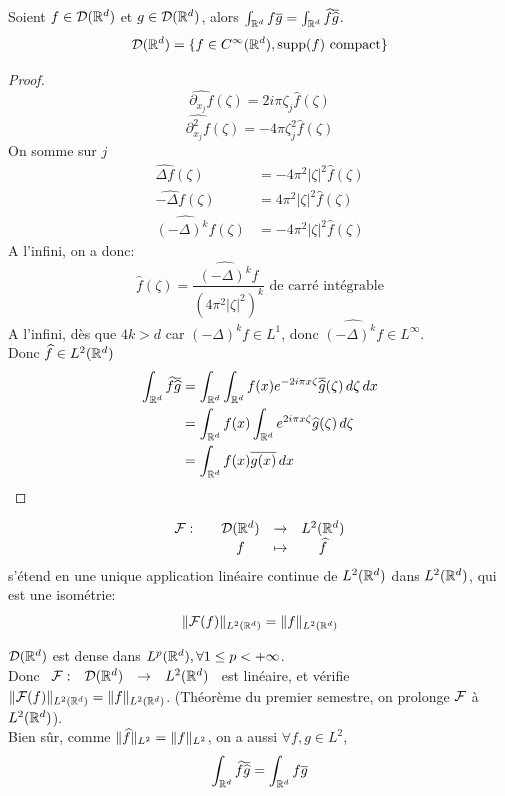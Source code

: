 \documentclass[]{report}
\begin{document}
    \begin{prop}{}{}
        Soient $f\in \mathcal{D}(\mathbb{R}^d)$ et $g\in \mathcal{D}(\mathbb{R}^d)$, alors $\int_{\mathbb{R}^d} f\overline{g}=\int_{\mathbb{R}^d} \widehat{f}\overline{\widehat{g}}$.\\
        \[\mathcal{D}(\mathbb{R}^d)=\{f\in C^\infty(\mathbb{R}^d),\text{supp}(f)\text{ compact}\}\]
    \end{prop}

    \begin{proof}
        \[\widehat{\partial_{x_j}f}(\zeta)=2i\pi \zeta_j \widehat{f}(\zeta)\]
        \[\widehat{\partial_{x_j}^2 f}(\zeta)=-4\pi \zeta_j^2\widehat{f}(\zeta)\]
        On somme sur $j$
        \begin{align*}
            \widehat{\Delta f}(\zeta)&=-4\pi^2|\zeta|^2\widehat{f}(\zeta)\\
            \widehat{-\Delta f}(\zeta)&=4\pi^2|\zeta|^2\widehat{f}(\zeta)\\
            \widehat{(-\Delta)^k f}(\zeta)&=-4\pi^2|\zeta|^2\widehat{f}(\zeta)
        \end{align*}
        A l'infini, on a donc:
        \[\widehat{f}(\zeta)=\frac{\widehat{(-\Delta)^k}f}{(4\pi^2|\zeta|^2)^k}\text{ de carré intégrable}\]
        A l'infini, dès que $4k>d$ car $(-\Delta)^k f\in L^1$, donc $\widehat{(-\Delta)^k f}\in L^\infty$.\\
        Donc $\widehat{f}\in L^2(\mathbb{R}^d)$
        \begin{align*}
            \int_{\mathbb{R}^d}\widehat{f}\overline{\widehat{g}}&=\int_{\mathbb{R}^d}\int_{\mathbb{R}^d}f(x)e^{-2i\pi x\zeta}\overline{\widehat{g}}(\zeta)\, d\zeta\, dx\\
            &=\int_{\mathbb{R}^d}f(x)\int_{\mathbb{R}^d}e^{2i\pi x\zeta}\widehat{g}(\zeta)\, d\zeta\\
            &=\int_{\mathbb{R}^d}f(x)\overline{g(x)}\, dx
        \end{align*}
    \end{proof}

    \begin{tm}{}{}
        \[\begin{array}{ccccc} \mathcal{F} : & & \mathcal{D}(\mathbb{R}^d) & \to & L^2(\mathbb{R}^d) \\ & & f & \mapsto & \widehat{f} \end{array}\]
        s'étend en une unique application linéaire continue de $L^2(\mathbb{R}^d)$ dans $L^2(\mathbb{R}^d)$, qui est une isométrie:
        \[\lVert \mathcal{F}(f) \rVert_{L^2(\mathbb{R}^d)}=\lVert f \rVert_{L^2(\mathbb{R}^d)}\]
    \end{tm}

    \begin{re}{}{}
        $\mathcal{D}(\mathbb{R}^d)$ est dense dans $L^p(\mathbb{R}^d),\forall 1\le p<+\infty$.\\
        Donc $\begin{array}{ccccc} \mathcal{F} : & \mathcal{D}(\mathbb{R}^d) & \to & L^2(\mathbb{R}^d) \end{array}$ est linéaire, et vérifie $\lVert \mathcal{F}(f) \rVert_{L^2(\mathbb{R}^d)}=\lVert f \rVert_{L^2(\mathbb{R}^d)}$. (Théorème du premier semestre, on prolonge $\mathcal{F}$ à $L^2(\mathbb{R}^d)$).\\
        Bien sûr, comme $\lVert \widehat{f} \rVert_{L^2}=\lVert f \rVert_{L^2}$, on a aussi $\forall f,g\in L^2$,
        \[\int_{\mathbb{R}^d}\widehat{f}\overline{\widehat{g}}=\int_{\mathbb{R}^d}f\overline{g}\]
    \end{re}
\end{document}
